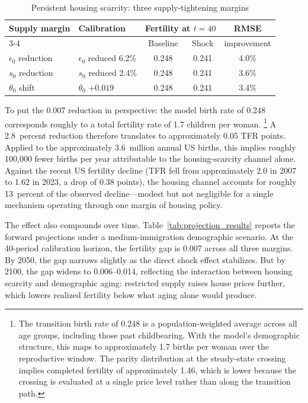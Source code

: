 \begin{table}[htbp]
\centering
\caption{Persistent housing scarcity: three supply-tightening margins}
\label{tab:scarcity_results}
\small
\begin{tabular}{l l cc c}
\toprule
Supply margin & Calibration & \multicolumn{2}{c}{Fertility at $t=40$} & RMSE \\
\cmidrule(lr){3-4}
 & & Baseline & Shock & improvement \\
\midrule
$\epsilon_0$ reduction & $\epsilon_0$ reduced 6.2\% & 0.248 & 0.241 & 4.0\% \\
$s_0$ reduction        & $s_0$ reduced 2.4\%        & 0.248 & 0.241 & 3.6\% \\
$\theta_0$ shift       & $\theta_0$ $+0.019$        & 0.248 & 0.241 & 3.4\% \\
\bottomrule
\end{tabular}
\end{table}

To put the 0.007 reduction in perspective: the model birth rate of 0.248 corresponds
roughly to a total fertility rate of 1.7 children per woman.%
\footnote{The transition birth rate of 0.248 is a population-weighted average across all age
groups, including those past childbearing. With the model's demographic structure, this maps
to approximately 1.7 births per woman over the reproductive window. The parity distribution
at the steady-state crossing implies completed fertility of approximately 1.46, which is
lower because the crossing is evaluated at a single price level rather than along the
transition path.} A 2.8~percent reduction
therefore translates to approximately 0.05 TFR points. Applied to the approximately
3.6~million annual US births, this implies roughly 100,000 fewer births per year
attributable to the housing-scarcity channel alone. Against the recent US fertility
decline (TFR fell from approximately 2.0 in 2007 to 1.62 in 2023, a drop of 0.38 points),
the housing channel accounts for roughly 13~percent of the observed decline---modest but
not negligible for a single mechanism operating through one margin of housing policy.

The effect also compounds over time. Table~\ref{tab:projection_results} reports the forward
projections under a medium-immigration demographic scenario. At the 40-period calibration
horizon, the fertility gap is 0.007 across all three margins. By 2050, the gap narrows
slightly as the direct shock effect stabilizes. But by 2100, the gap widens to
0.006--0.014, reflecting the interaction between housing scarcity and demographic aging:
restricted supply raises house prices further, which lowers realized fertility below what
aging alone would produce.

